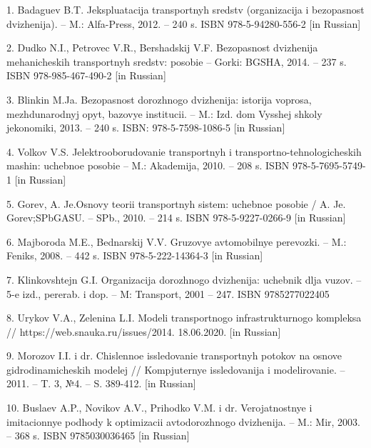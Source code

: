 \begin{noparindent}

1. Badaguev B.T. Jekspluatacija transportnyh sredstv (organizacija i
bezopasnost\textquotesingle{} dvizhenija). -- M.:
Al\textquotesingle fa-Press, 2012. -- 240 s. ISBN 978-5-94280-556-2
{[}in Russian{]}

2. Dudko N.I., Petrovec V.R., Bershadskij V.F.
Bezopasnost\textquotesingle{} dvizhenija mehanicheskih transportnyh
sredstv: posobie -- Gorki: BGSHA, 2014. -- 237 s. ISBN 978-985-467-490-2
{[}in Russian{]}

3. Blinkin M.Ja. Bezopasnost\textquotesingle{} dorozhnogo dvizhenija:
istorija voprosa, mezhdunarodnyj opyt, bazovye institucii. -- M.: Izd.
dom Vysshej shkoly jekonomiki, 2013. -- 240 s. ISBN: 978-5-7598-1086-5
{[}in Russian{]}

4. Volkov V.S. Jelektrooborudovanie transportnyh i
transportno-tehnologicheskih mashin: uchebnoe posobie -- M.: Akademija,
2010. -- 208 s. ISBN 978-5-7695-5749-1 {[}in Russian{]}

5. Gorev, A. Je.Osnovy teorii transportnyh sistem: uchebnoe posobie / A.
Je. Gorev;SPbGASU. -- SPb., 2010. -- 214 s. ISBN 978-5-9227-0266-9 {[}in
Russian{]}

6. Majboroda M.E., Bednarskij V.V. Gruzovye
avtomobil\textquotesingle nye perevozki. -- M.: Feniks, 2008. -- 442 s.
ISBN 978-5-222-14364-3 {[}in Russian{]}

7. Klinkovshtejn G.I. Organizacija dorozhnogo dvizhenija: uchebnik dlja
vuzov. -- 5-e izd., pererab. i dop. -- M: Transport, 2001 -- 247. ISBN
9785277022405

8. Urykov V.A., Zelenina L.I. Modeli transportnogo infrastrukturnogo
kompleksa // https://web.snauka.ru/issues/2014. 18.06.2020. {[}in
Russian{]}

9. Morozov I.I. i dr. Chislennoe issledovanie transportnyh potokov na
osnove gidrodinamicheskih modelej // Komp\textquotesingle juternye
issledovanija i modelirovanie. -- 2011. -- T. 3, №4. -- S. 389-412.
{[}in Russian{]}

10. Buslaev A.P., Novikov A.V., Prihod\textquotesingle ko V.M. i dr.
Verojatnostnye i imitacionnye podhody k optimizacii avtodorozhnogo
dvizhenija. -- M.: Mir, 2003. -- 368 s. ISBN 9785030036465 {[}in
Russian{]}
\end{noparindent}

